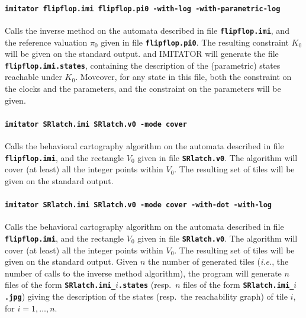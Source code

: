 \documentclass[a4paper,11pt]{report}
\makeatletter
\newcommand{\imitator}{\textsf{IMITATOR}}
\newcommand{\imitatorExec}{\code{imitator}}
\newcommand{\code}[1]{\textbf{\texttt{#1}}}
\newcommand{\ie}{\textcolor{colorok}{\textit{i.e.},\@}}
\makeatother
\begin{document}
\paragraph{\code{\imitatorExec{} flipflop.imi flipflop.pi0 -with-log -with-parametric-log}}
Calls the inverse method on the automata described in file \code{flipflop.imi}, and the reference valuation $\pi_0$ given in file \code{flipflop.pi0}.
The resulting constraint $K_0$ will be given on the standard output.
and \imitator{} will generate the file \code{flipflop.imi.states}, containing the description of the (parametric) states reachable under $K_0$.
Moveover, for any state in this file, both the constraint on the clocks and the parameters, and the constraint on the parameters will be given.


\paragraph{\code{\imitatorExec{} SRlatch.imi SRlatch.v0 -mode cover}}
Calls the behavioral cartography algorithm on the automata described in file \code{flipflop.imi}, and the rectangle $V_0$ given in file \code{SRlatch.v0}.
The algorithm will cover (at least) all the integer points within $V_0$.
The resulting set of tiles will be given on the standard output.


\paragraph{\code{\imitatorExec{} SRlatch.imi SRlatch.v0 -mode cover -with-dot -with-log}}
Calls the behavioral cartography algorithm on the automata described in file \code{flipflop.imi}, and the rectangle $V_0$ given in file \code{SRlatch.v0}.
The algorithm will cover (at least) all the integer points within $V_0$.
The resulting set of tiles will be given on the standard output.
Given $n$ the number of generated tiles (\ie{} the number of calls to the inverse method algorithm), the program will generate $n$ files of the form \code{SRlatch.imi\_$i$.states} (resp.~$n$ files of the form \code{SRlatch.imi\_$i$.jpg}) giving the description of the states (resp.~the reachability graph) of tile $i$, for $i = 1, \dots, n$.
\end{document}
